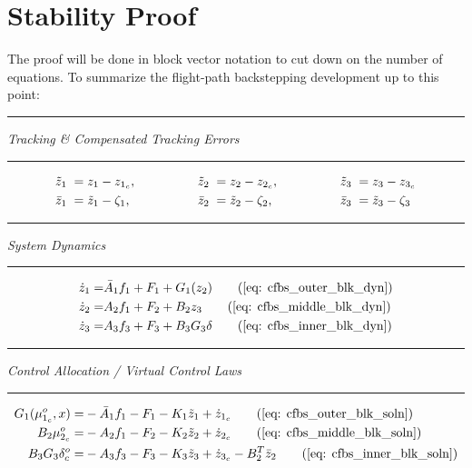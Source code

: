 \documentclass[12pt]{ucthesis}
\begin{document}
\section{Stability Proof}
\label{sec: uav_stab_proof}
The proof will be done in block vector notation to cut down on the number of equations. To summarize the flight-path backstepping development up to this point:%
\begin{center} {\color{lightgray}\rule[2pt]{1.625in}{1pt}} \noindent \textit{Tracking \& Compensated Tracking Errors} {\color{lightgray}\rule[2pt]{1.625in}{1pt}} \end{center}%
\vspace{-2em}
	\begin{alignat}{6}%
	\tilde{z}_1 \;=&\; z_1 - z_{1_c}, \qquad&\qquad \tilde{z}_2 \;=&\; z_2 - z_{2_c}, \qquad&\qquad \tilde{z}_3 \;=&\; z_3 - z_{3_c} \label{eq: uav_etrk} \\%
	  \bar{z}_1 \;=&\; \tilde{z}_1 - \filt_1, \qquad&\qquad \bar{z}_2 \;=&\; \tilde{z}_2 - \filt_2, \qquad&\qquad \bar{z}_3 \;=&\; \tilde{z}_3 - \filt_3 \label{eq: uav_ctrk}%
	\end{alignat}%
\begin{center} {\color{lightgray}\rule[2pt]{2.5in}{1pt}} \noindent \textit{System Dynamics} {\color{lightgray}\rule[2pt]{2.5in}{1pt}}  \end{center}%
\vspace{-1em}
	\begin{align}%
		\dot{z}_1 =& \bar{A}_1 f_1 + F_1 + G_1(z_2) 	\tag{\ref{eq: cfbs_outer_blk_dyn}}	\\%
		\dot{z}_2 =& A_2 f_1  + F_2 + B_2 z_3 			\tag{\ref{eq: cfbs_middle_blk_dyn}}	\\%
		\dot{z}_3 =& A_3 f_3 + F_3 + B_3 G_3 \delta 	\tag{\ref{eq: cfbs_inner_blk_dyn}}%
	\end{align}%
%
\begin{center} {\color{lightgray}\rule[2pt]{1.625in}{1pt}} \noindent \textit{Control Allocation / Virtual Control Laws} {\color{lightgray}\rule[2pt]{1.625in}{1pt}} \end{center}%
\vspace{-1em}
	\begin{align}%
		G_1(\mu^o_{1_c},x) =& -\bar{A}_1 f_1 -F_1 -K_1{\tilde{z}_1} + \dot{z}_{1_c}	\tag{\ref{eq: cfbs_outer_blk_soln}}	\\%
		B_2 \mu^o_{2_c} =& -A_2 f_1 -F_2 -K_2{\tilde{z}_2} + \dot{z}_{2_c}	\tag{\ref{eq: cfbs_middle_blk_soln}}	\\%
		B_3 G_3 \delta^o_{c} =& -A_3 f_3 -F_3 -K_3{\tilde{z}_3} + \dot{z}_{3_c} - B^T_2\bar{z}_2 	\tag{\ref{eq: cfbs_inner_blk_soln}}%
	\end{align}%
\end{document}
